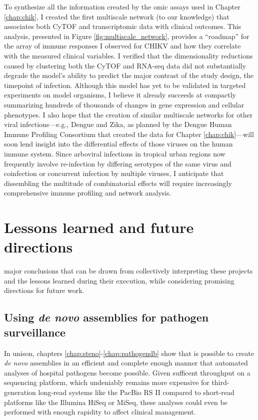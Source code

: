 To synthesize all the information created by the omic assays used in Chapter \ref{chap:chik}, I created the first multiscale network (to our knowledge) that associates both CyTOF and transcriptomic data with clinical outcomes. This analysis, presented in Figure \ref{fig:multiscale_network}, provides a ``roadmap'' for the array of immune responses I observed for CHIKV and how they correlate with the measured clinical variables. I verified that the dimensionality reductions caused by clustering both the CyTOF and RNA-seq data did not substantially degrade the model's ability to predict the major contrast of the study design, the timepoint of infection. Although this model has yet to be validated in targeted experiments on model organisms, I believe it already succeeds at compactly summarizing hundreds of thousands of changes in gene expression and cellular phenotypes. I also hope that the creation of similar multiscale networks for other viral infections—e.g., Dengue and Zika, as planned by the Dengue Human Immune Profiling Consortium that created the data for Chapter \ref{chap:chik}—will soon lend insight into the differential effects of those viruses on the human immune system. Since arboviral infections in tropical urban regions now frequently involve re-infection by differing serotypes of the same virus\autocite{OhAinle2011} and coinfection or concurrent infection by multiple viruses,\autocite{Waggoner2016} I anticipate that dissembling the multitude of combinatorial effects will require increasingly comprehensive immune profiling and network analysis.

\section{Lessons learned and future directions}

 major conclusions that can be drawn from collectively interpreting these projects and the lessons learned during their execution, while considering promising directions for future work.

\subsection{Using \emph{de novo} assemblies for pathogen surveillance}

In unison, chapters \ref{chap:steno}-\ref{chap:pathogendb} show that is possible to create \emph{de novo} assemblies in an efficient and complete enough manner that automated analyses of hospital pathogens become possible. Given sufficent throughput on a sequencing platform, which undeniably remains more expensive for third-generation long-read systems like the PacBio RS II compared to short-read platforms like the Illumina HiSeq or MiSeq, these analyses could even be performed with enough rapidity to affect clinical management.

